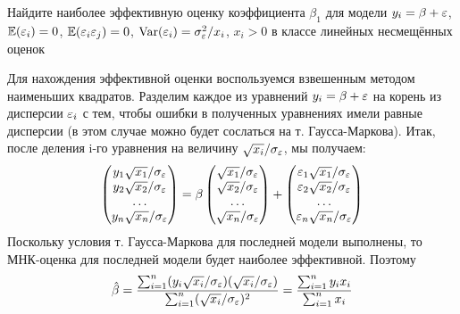 \begin{problem}
Найдите наиболее эффективную оценку коэффициента $\beta_1$ для модели $y_i = \beta + \varepsilon$, $\mathbb{E}(\varepsilon_i) = 0$, $\mathbb{E}(\varepsilon_i\varepsilon_j) = 0$, $\operatorname{Var}(\varepsilon_i) = \sigma_{\varepsilon}^2 / x_i$, $x_i > 0$ в классе линейных несмещённых оценок


\begin{sol}
Для нахождения эффективной оценки воспользуемся взвешенным методом наименьших квадратов. Разделим каждое из уравнений $y_i = \beta + \varepsilon$ на корень из дисперсии $\varepsilon_i$ с тем, чтобы ошибки в полученных уравнениях имели равные дисперсии (в этом случае можно будет сослаться на т. Гаусса-Маркова). Итак, после деления i-го уравнения на величину $\sqrt{x_i}/\sigma_{\varepsilon}$, мы получаем:
\[
\begin{pmatrix}
y_1 \sqrt{x_1}/\sigma_{\varepsilon} \\
y_2 \sqrt{x_2}/\sigma_{\varepsilon} \\
\ldots \\
y_n \sqrt{x_n}/\sigma_{\varepsilon} \\
\end{pmatrix} = \beta \begin{pmatrix}
\sqrt{x_1}/\sigma_{\varepsilon} \\
\sqrt{x_2}/\sigma_{\varepsilon} \\
\ldots \\
\sqrt{x_n}/\sigma_{\varepsilon} \\
\end{pmatrix} + \begin{pmatrix}
\varepsilon_1 \sqrt{x_1}/\sigma_{\varepsilon} \\
\varepsilon_2 \sqrt{x_2}/\sigma_{\varepsilon} \\
\ldots \\
\varepsilon_n \sqrt{x_n}/\sigma_{\varepsilon} \\
\end{pmatrix}
\]
Поскольку условия т. Гаусса-Маркова для последней модели выполнены, то МНК-оценка для последней модели будет наиболее эффективной. Поэтому
\[
\hat{\beta} = \frac{\sum_{i=1}^n (y_i \sqrt{x_i}/\sigma_{\varepsilon})(\sqrt{x_i}/\sigma_{\varepsilon})}{\sum_{i=1}^n (\sqrt{x_i}/\sigma_{\varepsilon})^2} = \frac{\sum_{i=1}^n y_i x_i}{\sum_{i=1}^n x_i}
\]
\end{sol}
\end{problem}



